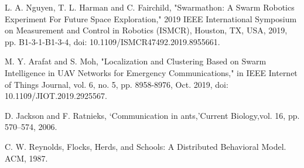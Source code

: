 \documentclass{UoYCSproject}
\begin{document}
\begin{thebibliography}{100}
L. A. Nguyen, T. L. Harman and C. Fairchild, "Swarmathon: A Swarm Robotics Experiment For Future Space Exploration," 2019 IEEE International Symposium on Measurement and Control in Robotics (ISMCR), Houston, TX, USA, 2019, pp. B1-3-1-B1-3-4, doi: 10.1109/ISMCR47492.2019.8955661.

M. Y. Arafat and S. Moh, "Localization and Clustering Based on Swarm Intelligence in UAV Networks for Emergency Communications," in IEEE Internet of Things Journal, vol. 6, no. 5, pp. 8958-8976, Oct. 2019, doi: 10.1109/JIOT.2019.2925567.

D. Jackson and F. Ratnieks, ‘Communication in ants,’Current Biology,vol. 16, pp. 570–574, 2006.

C. W. Reynolds, Flocks, Herds, and Schools: A Distributed Behavioral Model. ACM, 1987.

\end{thebibliography}
\end{document}

